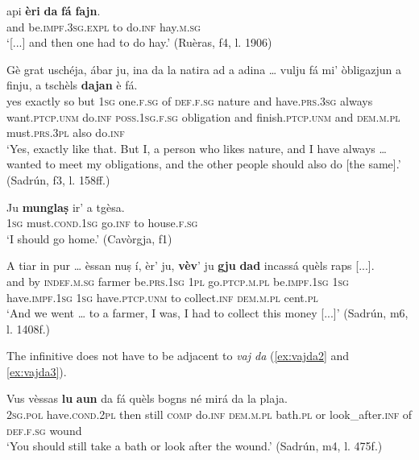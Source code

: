\ea
\label{ex:essarda1}
	\gll [...] api \textbf{èri} \textbf{da} \textbf{fá} \textbf{fajn}.\\
{} and be.\textsc{impf.3sg.expl} to do.\textsc{inf} hay.\textsc{m.sg}\\
\glt `[...] and then one had to do hay.' (Ruèras, f4, l. 1906)
\z

\ea
\label{ex:duaj1}
\gll Gè grat uschéja, ábar ju, ina da la natira ad a adina … vulju fá mi' òbligazjun a finju, a tschèls \textbf{dajan} è fá.\\
yes exactly so but \textsc{1sg} one.\textsc{f.sg} of \textsc{def.f.sg} nature and have.\textsc{prs.3sg} always {} want.\textsc{ptcp.unm} do.\textsc{inf} \textsc{poss.1sg.f.sg} obligation and finish.\textsc{ptcp.unm} and \textsc{dem.m.pl} must.\textsc{prs.3pl} also do.\textsc{inf}\\
\glt `Yes, exactly like that. But I, a person who likes nature, and I have always … wanted to meet my obligations, and the other people should also do [the same].' (Sadrún, f3, l. 158ff.)
\z

\ea\label{ex:mung1}
\gll  Ju \textbf{munglaṣ} ir' a tgèsa.\\
\textsc{1sg}  must.\textsc{cond.1sg} go.\textsc{inf} to house.\textsc{f.sg} \\
\glt `I should go home.' (Cavòrgja, f1)
\z

\ea\label{ex:vajda1}
\gll    A tiar in pur … èssan nuṣ í, èr’ ju, \textbf{vèv}’ ju \textbf{gju} \textbf{dad} incassá quèls raps [...].\\ 
and by \textsc{indef.m.sg} farmer {} be.\textsc{prs.1sg} \textsc{1pl} go.\textsc{ptcp.m.pl}  be.\textsc{impf.1sg} \textsc{1sg}  have.\textsc{impf.1sg} \textsc{1sg} have.\textsc{ptcp.unm} to collect.\textsc{inf}  \textsc{dem.m.pl} cent.\textsc{pl}\\
\glt `And we went … to a farmer, I was, I had to collect this money [...]' (Sadrún, m6, l. 1408f.)
\z


The infinitive does not have to be adjacent to \textit{vaj da} (\ref{ex:vajda2} and \ref{ex:vajda3}). 

\ea
\label{ex:vajda2}
\gll  Vus vèssas \textbf{lu} \textbf{aun} da fá quèls bogns né mirá da la plaja.\\
\textsc{2sg.pol}  have.\textsc{cond.2pl} then still \textsc{comp} do.\textsc{inf} \textsc{dem.m.pl} bath.\textsc{pl} or look\_after.\textsc{inf} of \textsc{def.f.sg} wound\\
\glt `You should still take a bath or look after the wound.' (Sadrún, m4, l. 475f.)
\z

